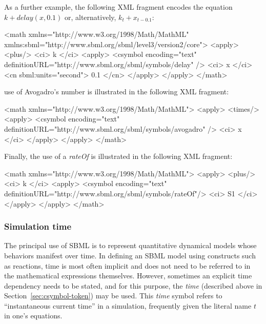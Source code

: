 As a further example, the following XML fragment encodes the equation
$k + delay(x, 0.1)$ or, alternatively, $k_t + x_{t - 0.1}$:

\begin{example}
<math xmlns="http://www.w3.org/1998/Math/MathML"
      xmlns:sbml="http://www.sbml.org/sbml/level3/version2/core">
    <apply>
        <plus/>
        <ci> k </ci>
        <apply>
            <csymbol encoding="text" definitionURL="http://www.sbml.org/sbml/symbols/delay" />
            <ci> x </ci>
            <cn sbml:units="second"> 0.1 </cn>
        </apply>
    </apply>
</math>
\end{example}

 use of Avogadro's number is illustrated in the
following XML fragment:

\begin{example}
<math xmlns="http://www.w3.org/1998/Math/MathML">
    <apply>
        <times/>
        <apply>
            <csymbol encoding="text" definitionURL="http://www.sbml.org/sbml/symbols/avogadro" />
            <ci> x </ci>
        </apply>
    </apply>
</math>
\end{example}

\begin{blockChanged}
Finally, the use of a \emph{rateOf} is illustrated in the
following XML fragment:

\begin{example}
<math xmlns="http://www.w3.org/1998/Math/MathML">
  <apply>
    <plus/>
    <ci> k </ci>
    <apply>
      <csymbol encoding="text" definitionURL="http://www.sbml.org/sbml/symbols/rateOf"/>
      <ci> S1 </ci>
    </apply>
  </apply>
</math>
\end{example}
\end{blockChanged}

\subsubsection{Simulation time}
\label{sec:meaning-of-time}

The principal use of SBML is to represent quantitative dynamical
models whose behaviors manifest over time.  In defining an
SBML model using constructs such as reactions, time is most often
implicit and does not need to be referred to in the mathematical
expressions themselves.  However, sometimes an explicit time
dependency needs to be stated, and for this purpose, the
\emph{time}  (described above in
Section~\ref{sec:csymbol-token}) may be used.  This \emph{time}
symbol refers to ``instantaneous current time'' in a simulation,
frequently given the literal name $t$ in one's equations.


